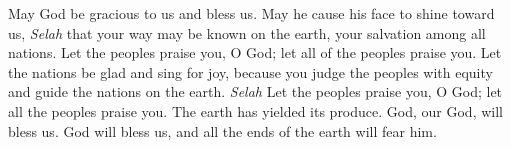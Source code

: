 \begin{biblechapter} %
 May God be gracious to us and bless us. 
May he cause his face to shine toward us, \textit{Selah}
\verse that your way may be known on the earth, 
your salvation among all nations.
\verse Let the peoples praise you, O God; 
let all of the peoples praise you.
\verse Let the nations be glad and sing for joy, 
because you judge the peoples with equity 
and guide the nations on the earth. \textit{Selah}
\verse Let the peoples praise you, O God; 
let all the peoples praise you.
\verse The earth has yielded its produce. 
God, our God, will bless us.
\verse God will bless us, 
and all the ends of the earth will fear him.
\end{biblechapter}

